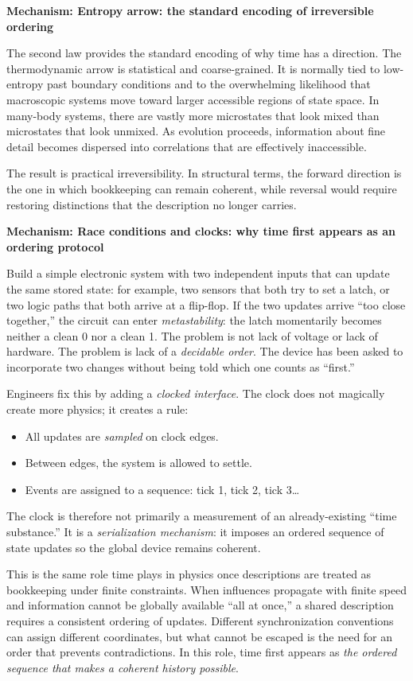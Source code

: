 \documentclass[11pt,twoside,openright]{book}
\newenvironment{mechanismbox}[1]
  {\begin{framed}\noindent\textbf{Mechanism: #1}\par\medskip}
  {\end{framed}}
\begin{document}
\begin{mechanismbox}{Entropy arrow: the standard encoding of irreversible ordering}

The second law provides the standard encoding of why time has a direction. The thermodynamic arrow is statistical and coarse-grained. It is normally tied to low-entropy past boundary conditions and to the overwhelming likelihood that macroscopic systems move toward larger accessible regions of state space. In many-body systems, there are vastly more microstates that look mixed than microstates that look unmixed. As evolution proceeds, information about fine detail becomes dispersed into correlations that are effectively inaccessible.

The result is practical irreversibility. In structural terms, the forward direction is the one in which bookkeeping can remain coherent, while reversal would require restoring distinctions that the description no longer carries.

\end{mechanismbox}
\begin{mechanismbox}{Race conditions and clocks: why time first appears as an ordering protocol}
Build a simple electronic system with two independent inputs that can update the same stored state: for example, two sensors that both try to set a latch, or two logic paths that both arrive at a flip-flop. If the two updates arrive ``too close together,'' the circuit can enter \emph{metastability}: the latch momentarily becomes neither a clean 0 nor a clean 1. The problem is not lack of voltage or lack of hardware. The problem is lack of a \emph{decidable order}. The device has been asked to incorporate two changes without being told which one counts as ``first.''

Engineers fix this by adding a \emph{clocked interface}. The clock does not magically create more physics; it creates a rule:
\begin{itemize}
\item All updates are \emph{sampled} on clock edges.
\item Between edges, the system is allowed to settle.
\item Events are assigned to a sequence: tick 1, tick 2, tick 3\ldots
\end{itemize}
The clock is therefore not primarily a measurement of an already-existing ``time substance.'' It is a \emph{serialization mechanism}: it imposes an ordered sequence of state updates so the global device remains coherent.

This is the same role time plays in physics once descriptions are treated as bookkeeping under finite constraints. When influences propagate with finite speed and information cannot be globally available ``all at once,'' a shared description requires a consistent ordering of updates. Different synchronization conventions can assign different coordinates, but what cannot be escaped is the need for an order that prevents contradictions. In this role, time first appears as \emph{the ordered sequence that makes a coherent history possible}.
\end{mechanismbox}
\end{document}
